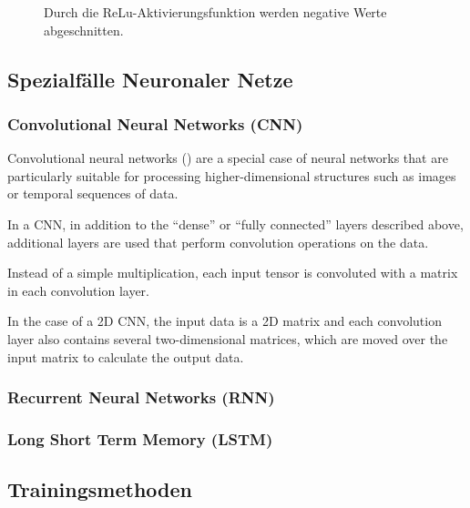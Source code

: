		\begin{figure}[ht]
			\centering
		\caption{Durch die ReLu-Aktivierungsfunktion werden negative Werte abgeschnitten.}
		\label{fig:relu_plot}
		\end{figure}

	
	\subsection { Spezialfälle Neuronaler Netze}
		\subsubsection { Convolutional Neural Networks (CNN) }
		Convolutional neural networks () are a special case of neural networks that are particularly suitable for processing higher-dimensional structures such as images or temporal sequences of data. 

		In a CNN, in addition to the "`dense"' or "`fully connected"' layers described above, additional layers are used that perform convolution operations on the data.

		Instead of a simple multiplication, each input tensor is convoluted with a matrix in each convolution layer.

		In the case of a 2D CNN, the input data is a 2D matrix and each convolution layer also contains several two-dimensional matrices, which are moved over the input matrix to calculate the output data. 

		
		
		
		\subsubsection { Recurrent Neural Networks (RNN) }
		\subsubsection { Long Short Term Memory (LSTM) }
	
	\subsection { Trainingsmethoden }
		
